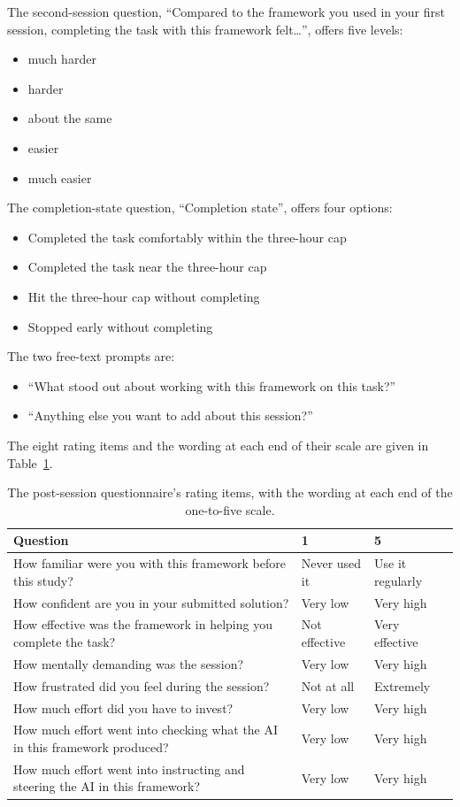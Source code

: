 The second-session question, ``Compared to the framework you used in your first session, completing the task with this framework felt\ldots'', offers five levels:
\begin{itemize}[nosep]
    \item much harder
    \item harder
    \item about the same
    \item easier
    \item much easier
\end{itemize}
The completion-state question, ``Completion state'', offers four options:
\begin{itemize}[nosep]
    \item Completed the task comfortably within the three-hour cap
    \item Completed the task near the three-hour cap
    \item Hit the three-hour cap without completing
    \item Stopped early without completing
\end{itemize}
The two free-text prompts are:
\begin{itemize}[nosep]
    \item ``What stood out about working with this framework on this task?''
    \item ``Anything else you want to add about this session?''
\end{itemize}

The eight rating items and the wording at each end of their scale are given in Table~\ref{tab:evaluation-questionnaire-items}.

\begin{table}[H]
  \centering
  \caption{The post-session questionnaire's rating items, with the wording at each end of the one-to-five scale.}
  \label{tab:evaluation-questionnaire-items}
  \begin{tabular*}{\textwidth}{@{\extracolsep{\fill}}p{}ll}
    \toprule
    Question & 1 & 5 \\
    \midrule
    How familiar were you with this framework before this study? & Never used it & Use it regularly \\
    How confident are you in your submitted solution? & Very low & Very high \\
    How effective was the framework in helping you complete the task? & Not effective & Very effective \\
    How mentally demanding was the session? & Very low & Very high \\
    How frustrated did you feel during the session? & Not at all & Extremely \\
    How much effort did you have to invest? & Very low & Very high \\
    How much effort went into checking what the AI in this framework produced? & Very low & Very high \\
    How much effort went into instructing and steering the AI in this framework? & Very low & Very high \\
    \bottomrule
  \end{tabular*}
\end{table}

